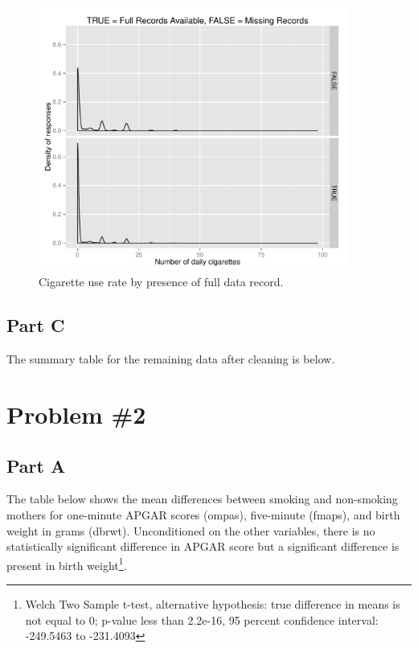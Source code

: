 \documentclass[a4paper, 12pt]{article}
\begin{document}
\begin{figure}[!h] %
   \centering
   \includegraphics[width=4in]{img/cigar-by-record-type.pdf} 
   \caption{Cigarette use rate by presence of full data record.}
   \label{fig:cigarFullData}
\end{figure}

\subsection{Part C}
The summary table for the remaining data after cleaning is below.
%


\section{Problem \#2}

\subsection{Part A}

The table below shows the mean differences between smoking and non-smoking mothers for one-minute APGAR scores (ompas), five-minute (fmaps), and birth weight in grams (dbrwt).  Unconditioned on the other variables, there is no statistically significant difference in APGAR score but a significant difference is present in birth weight\footnote{Welch Two Sample t-test, alternative hypothesis: true difference in means is not equal to 0; p-value less than 2.2e-16, 95 percent confidence interval: -249.5463 to -231.4093}.   
\end{document}
